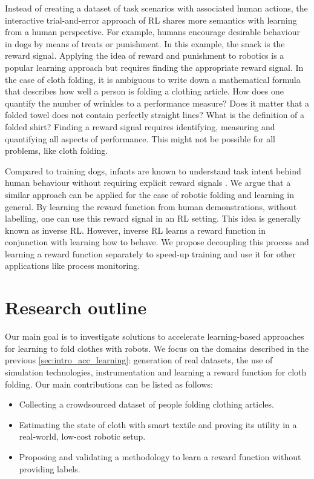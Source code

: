 \documentclass[\home/main.tex]{subfiles}
\begin{document}
Instead of creating a dataset of task scenarios with associated human actions, the interactive trial-and-error approach of \gls{RL} shares more semantics with learning from a human perspective. For example, humans encourage desirable behaviour in dogs by means of treats or punishment. In this example, the snack is the reward signal. Applying the idea of reward and punishment to robotics is a popular learning approach but requires finding the appropriate reward signal. In the case of cloth folding, it is ambiguous to write down a mathematical formula that describes how well a person is folding a clothing article. How does one quantify the number of wrinkles to a performance measure? Does it matter that a folded towel does not contain perfectly straight lines? What is the definition of a folded shirt? Finding a reward signal requires identifying, measuring and quantifying all aspects of performance. This might not be possible for all problems, like cloth folding.

Compared to training dogs, infants are known to understand task intent behind human behaviour without requiring explicit reward signals \autocite{warneken2006altruistic}.
We argue that a similar approach can be applied for the case of robotic folding and learning in general. By learning the reward function from human demonstrations, without labelling, one can use this reward signal in an \gls{RL} setting. This idea is generally known as inverse \gls{RL}. However, inverse RL learns a reward function in conjunction with learning how to behave. We propose decoupling this process and learning a reward function separately to speed-up training and use it for other applications like process monitoring.

\section{Research outline}
Our main goal is to investigate solutions to accelerate learning-based approaches for learning to fold clothes with robots. We focus on the domains described in the previous \cref{sec:intro_acc_learning}: generation of real datasets, the use of simulation technologies, instrumentation and learning a reward function for cloth folding. Our main contributions can be listed as follows:
\begin{itemize}
    \item Collecting a crowdsourced dataset of people folding clothing articles.
    \item Estimating the state of cloth with smart textile and proving its utility in a real-world, low-cost robotic setup.
    \item Proposing and validating a methodology to learn a reward function without providing labels.
\end{itemize}
\end{document}
